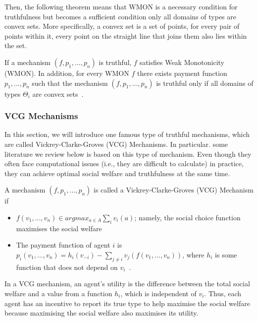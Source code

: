\documentclass[11pt]{phdthesis}
\begin{document}
Then, the following theorem means that WMON is a necessary condition for truthfulness but becomes a sufficient condition only all domains of types are convex sets. More specifically, a convex set is a set of points, for every pair of points within it, every point on the straight line that joins them also lies within the set.

\begin{theorem}
	If a mechanism $(f,p_1,...,p_n)$ is truthful, $f$ satisfies Weak Monotonicity (WMON). In addition, for every WMON $f$ there exists payment function $p_1,...,p_n$ such that the mechanism $(f,p_1,...,p_n)$ is truthful only if all domains of types $\Theta_i$ are convex sets~\citep[Theorem 9.29]{nisan2007algorithmic}.
\end{theorem}

\subsubsection{VCG Mechanisms} \label{VCG machanisms}

In this section, we will introduce one famous type of truthful mechanisms, which are called Vickrey-Clarke-Groves (VCG) Mechanisms. In particular. some literature we review below is based on this type of mechanism. Even though they often face computational issues (i.e., they are difficult to calculate) in practice, they can achieve optimal social welfare and truthfulness at the same time. 

\begin{definition}
	A mechanism $(f,p_1,...,p_n)$ is called a Vickrey-Clarke-Groves (VCG) Mechanism if 
	\begin{itemize}
		\item $f(v_1,...,v_n) \in argmax_{a \in A}\sum_iv_i(a)$; namely, the social choice function maximises the social welfare
		\item The payment function of agent $i$ is $p_i(v_1,...,v_n) = h_i(v_{-i}) - \sum_{j \neq i}v_j(f(v_1,...,v_n))$, where $h_i$ is some function that does not depend on $v_i$~\citep[Definition 9.16]{nisan2007algorithmic}.
	\end{itemize}
\end{definition}

In a VCG mechanism, an agent's utility is the difference between the total social welfare and a value from a function $h_i$, which is independent of $v_i$. Thus, each agent has an incentive to report its true type to help maximise the social welfare because maximising the social welfare also maximises its utility.
\end{document}
